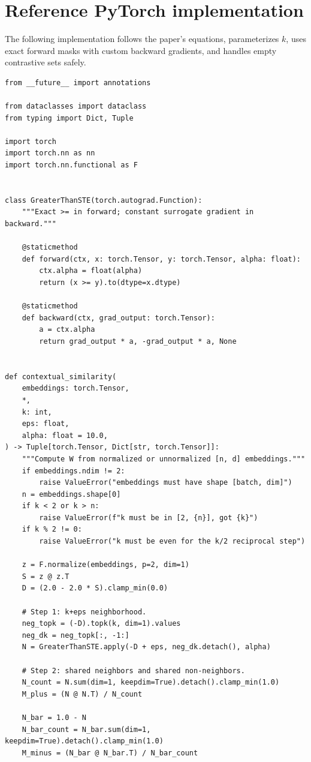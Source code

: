\documentclass[11pt,oneside,openany]{book}
\theoremstyle{myplain}
\theoremstyle{definition}
\begin{document}
\section{Reference PyTorch implementation}

The following implementation follows the paper's equations, parameterizes $k$, uses exact forward masks with custom backward gradients, and handles empty contrastive sets safely.

\begin{lstlisting}
from __future__ import annotations

from dataclasses import dataclass
from typing import Dict, Tuple

import torch
import torch.nn as nn
import torch.nn.functional as F


class GreaterThanSTE(torch.autograd.Function):
    """Exact >= in forward; constant surrogate gradient in backward."""

    @staticmethod
    def forward(ctx, x: torch.Tensor, y: torch.Tensor, alpha: float):
        ctx.alpha = float(alpha)
        return (x >= y).to(dtype=x.dtype)

    @staticmethod
    def backward(ctx, grad_output: torch.Tensor):
        a = ctx.alpha
        return grad_output * a, -grad_output * a, None


def contextual_similarity(
    embeddings: torch.Tensor,
    *,
    k: int,
    eps: float,
    alpha: float = 10.0,
) -> Tuple[torch.Tensor, Dict[str, torch.Tensor]]:
    """Compute W from normalized or unnormalized [n, d] embeddings."""
    if embeddings.ndim != 2:
        raise ValueError("embeddings must have shape [batch, dim]")
    n = embeddings.shape[0]
    if k < 2 or k > n:
        raise ValueError(f"k must be in [2, {n}], got {k}")
    if k % 2 != 0:
        raise ValueError("k must be even for the k/2 reciprocal step")

    z = F.normalize(embeddings, p=2, dim=1)
    S = z @ z.T
    D = (2.0 - 2.0 * S).clamp_min(0.0)

    # Step 1: k+eps neighborhood.
    neg_topk = (-D).topk(k, dim=1).values
    neg_dk = neg_topk[:, -1:]
    N = GreaterThanSTE.apply(-D + eps, neg_dk.detach(), alpha)

    # Step 2: shared neighbors and shared non-neighbors.
    N_count = N.sum(dim=1, keepdim=True).detach().clamp_min(1.0)
    M_plus = (N @ N.T) / N_count

    N_bar = 1.0 - N
    N_bar_count = N_bar.sum(dim=1, keepdim=True).detach().clamp_min(1.0)
    M_minus = (N_bar @ N_bar.T) / N_bar_count


\end{lstlisting}
\end{document}
